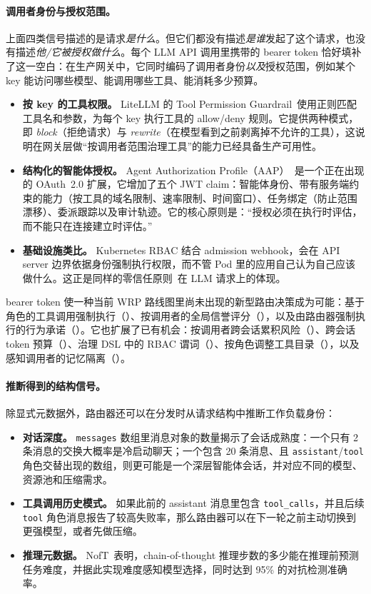 \paragraph{调用者身份与授权范围。}
上面四类信号描述的是请求\emph{是什么}。但它们都没有描述\emph{是谁}发起了这个请求，也没有描述\emph{他/它被授权做什么}。每个 LLM API 调用里携带的 bearer token 恰好填补了这一空白：在生产网关中，它同时编码了调用者身份\emph{以及}授权范围，例如某个 key 能访问哪些模型、能调用哪些工具、能消耗多少预算。
\begin{itemize}[nosep]
  \item \textbf{按 key 的工具权限。}
        LiteLLM 的 Tool Permission Guardrail~\cite{litellm2026toolguard}使用正则匹配工具名和参数，为每个 key 执行工具的 allow/deny 规则。它提供两种模式，即 \emph{block}（拒绝请求）与 \emph{rewrite}（在模型看到之前剥离掉不允许的工具），这说明在网关层做“按调用者范围治理工具”的能力已经具备生产可用性。
  \item \textbf{结构化的智能体授权。}
        Agent Authorization Profile（AAP）~\cite{aap2026}是一个正在出现的 OAuth~2.0 扩展，它增加了五个 JWT claim：智能体身份、带有服务端约束的能力（按工具的域名限制、速率限制、时间窗口）、任务绑定（防止范围漂移）、委派跟踪以及审计轨迹。它的核心原则是：“授权必须在执行时评估，而不能只在连接建立时评估。”
  \item \textbf{基础设施类比。}
        Kubernetes RBAC 结合 admission webhook，会在 API server 边界依据身份强制执行权限，而不管 Pod 里的应用自己认为自己应该做什么。这正是同样的零信任原则~\cite{nist800207}在 LLM 请求上的体现。
\end{itemize}
bearer token 使一种当前 WRP 路线图里尚未出现的新型路由决策成为可能：基于角色的工具调用强制执行（）、按调用者的全局信誉评分（），以及由路由器强制执行的行为承诺（）。它也扩展了已有机会：按调用者跨会话累积风险（）、跨会话 token 预算（）、治理 DSL 中的 RBAC 谓词（）、按角色调整工具目录（），以及感知调用者的记忆隔离（）。

\paragraph{推断得到的结构信号。}
除显式元数据外，路由器还可以在分发时从请求结构中推断工作负载身份：
\begin{itemize}[nosep]
  \item \textbf{对话深度。} \texttt{messages} 数组里消息对象的数量揭示了会话成熟度：一个只有 2 条消息的交换大概率是冷启动聊天；一个包含 20 条消息、且 \texttt{assistant}/\texttt{tool} 角色交替出现的数组，则更可能是一个深层智能体会话，并对应不同的模型、资源池和压缩需求。
  \item \textbf{工具调用历史模式。} 如果此前的 assistant 消息里包含 \texttt{tool\_calls}，并且后续 \texttt{tool} 角色消息报告了较高失败率，那么路由器可以在下一轮之前主动切换到更强模型，或者先做压缩。
  \item \textbf{推理元数据。} NofT~\cite{noft2026}表明，chain-of-thought 推理步数的多少能在推理前预测任务难度，并据此实现难度感知模型选择，同时达到 95\% 的对抗检测准确率。
\end{itemize}

